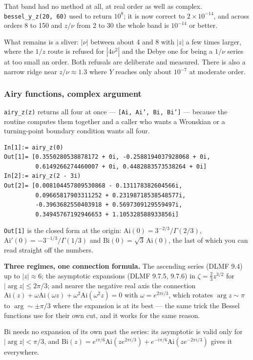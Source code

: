 \documentclass[11pt]{article}
\newcommand{\code}[1]{\texttt{#1}}
\begin{document}
That band had no method at all, at real order as well as complex.
\code{bessel\_y\_z(20, 60)} used to return $10^8$; it is now correct to
$2\times10^{-14}$, and across orders 8 to 150 and $z/\nu$ from 2 to 30
the whole band is $10^{-14}$ or better.

What remains is a sliver: $|\nu|$ between about 4 and 8 with $|z|$ a few
times larger, where the $1/z$ route is refused for $|4\nu^2|$ and the
Debye one for being a $1/\nu$ series at too small an order. Both
refusals are deliberate and measured. There is also a narrow ridge near
$z/\nu \approx 1.3$ where $Y$ reaches only about $10^{-7}$ at moderate
order.

\subsubsection*{Airy functions, complex argument}

\code{airy\_z(z)} returns all four at once --- \code{[Ai, Ai', Bi, Bi']}
--- because the routine computes them together and a caller who wants a
Wronskian or a turning-point boundary condition wants all four.

\begin{lstlisting}
In[1]:= airy_z(0)
Out[1]= [0.3550280538878172 + 0i, -0.2588194037928068 + 0i,
         0.6149266274460007 + 0i, 0.4482883573538264 + 0i]
In[2]:= airy_z(2 - 3i)
Out[2]= [0.008104457809530868 - 0.131178382604566i,
         0.09665817903311252 + 0.23198718538548577i,
         -0.3963682550403918 + 0.5697309129559497i,
         0.34945767192946653 + 1.105328588933856i]
\end{lstlisting}

\code{Out[1]} is the closed form at the origin:
$\mathrm{Ai}(0) = 3^{-2/3}/\Gamma(2/3)$,
$\mathrm{Ai}'(0) = -3^{-1/3}/\Gamma(1/3)$ and
$\mathrm{Bi}(0) = \sqrt3\,\mathrm{Ai}(0)$, the last of which you can read
straight off the numbers.

\textbf{Three regimes, one connection formula.} The ascending series
(DLMF 9.4) up to $|z|\approx 6$; the asymptotic expansions (DLMF 9.7.5,
9.7.6) in $\zeta = \tfrac23 z^{3/2}$ for $|\arg z| \le 2\pi/3$; and
nearer the negative real axis the connection
$\mathrm{Ai}(z) + \omega\mathrm{Ai}(\omega z)
 + \omega^2\mathrm{Ai}(\omega^2 z) = 0$ with $\omega = e^{2\pi i/3}$,
which rotates $\arg z \sim \pi$ to $\arg \sim \pm\pi/3$ where the
expansion is at its best --- the same trick the Bessel functions use for
their own cut, and it works for the same reason.

$\mathrm{Bi}$ needs no expansion of its own past the series: its
asymptotic is valid only for $|\arg z| < \pi/3$, and
$\mathrm{Bi}(z) = e^{i\pi/6}\mathrm{Ai}(ze^{2\pi i/3})
 + e^{-i\pi/6}\mathrm{Ai}(ze^{-2\pi i/3})$ gives it everywhere.
\end{document}
